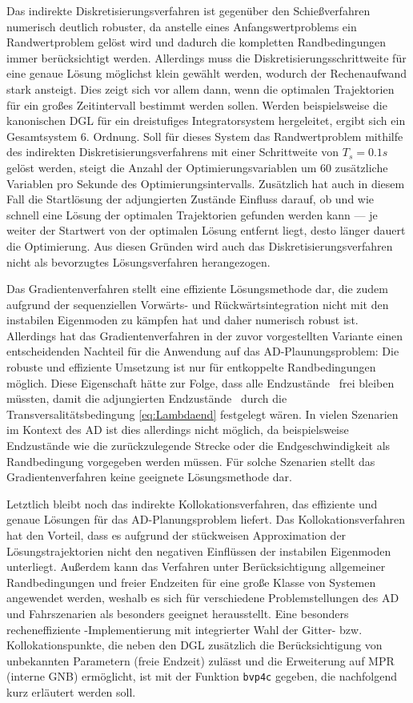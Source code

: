 Das indirekte Diskretisierungsverfahren ist gegenüber den Schießverfahren numerisch deutlich robuster, da anstelle eines Anfangswertproblems ein Randwertproblem gelöst wird und dadurch die kompletten Randbedingungen immer berücksichtigt werden. Allerdings muss die Diskretisierungsschrittweite für eine genaue Lösung möglichst klein gewählt werden, wodurch der Rechenaufwand stark ansteigt. Dies zeigt sich vor allem dann, wenn die optimalen Trajektorien für ein großes Zeitintervall bestimmt werden sollen. Werden beispielsweise die kanonischen \gls{DGL} für ein dreistufiges Integratorsystem hergeleitet, ergibt sich ein Gesamtsystem 6. Ordnung. Soll für dieses System das Randwertproblem mithilfe des indirekten Diskretisierungsverfahrens mit einer Schrittweite von $T_s = 0.1\unit{s}$ gelöst werden, steigt die Anzahl der Optimierungsvariablen um 60 zusätzliche Variablen pro Sekunde des Optimierungsintervalls. Zusätzlich hat auch in diesem Fall die Startlösung der adjungierten Zustände Einfluss darauf, ob und wie schnell eine Lösung der optimalen Trajektorien gefunden werden kann --- je weiter der Startwert von der optimalen Lösung entfernt liegt, desto länger dauert die Optimierung. Aus diesen Gründen wird auch das Diskretisierungsverfahren nicht als bevorzugtes Lösungsverfahren herangezogen. 

Das Gradientenverfahren stellt eine effiziente Lösungsmethode dar, die zudem aufgrund der sequenziellen Vorwärts- und Rückwärtsintegration nicht mit den instabilen Eigenmoden zu kämpfen hat und daher numerisch robust ist. Allerdings hat das Gradientenverfahren in der zuvor vorgestellten Variante einen entscheidenden Nachteil für die Anwendung auf das \gls{AD}-Plaunungsproblem: Die robuste und effiziente Umsetzung ist nur für entkoppelte Randbedingungen möglich. Diese Eigenschaft hätte zur Folge, dass alle Endzustände \xoftf~frei bleiben müssten, damit die adjungierten Endzustände \lambdaoftf~durch die Transversalitätsbedingung \eqref{eq:Lambdaend} festgelegt wären. In vielen Szenarien im Kontext des \gls{AD} ist dies allerdings nicht möglich, da beispielsweise Endzustände wie die zurückzulegende Strecke oder die Endgeschwindigkeit als Randbedingung vorgegeben werden müssen. Für solche Szenarien stellt das Gradientenverfahren keine geeignete Lösungsmethode dar. 

Letztlich bleibt noch das indirekte Kollokationsverfahren, das effiziente und genaue Lösungen für das \gls{AD}-Planungsproblem liefert. Das Kollokationsverfahren hat den Vorteil, dass es aufgrund der stückweisen Approximation der Lösungstrajektorien nicht den negativen Einflüssen der instabilen Eigenmoden unterliegt. Außerdem kann das Verfahren unter Berücksichtigung allgemeiner Randbedingungen und freier Endzeiten für eine große Klasse von Systemen angewendet werden, weshalb es sich für verschiedene Problemstellungen des \gls{AD} und Fahrszenarien als besonders geeignet herausstellt. Eine besonders recheneffiziente \Matlab-Implementierung mit integrierter Wahl der Gitter- bzw. Kollokationspunkte, die neben den \gls{DGL} zusätzlich die Berücksichtigung von unbekannten Parametern (freie Endzeit) zulässt und die Erweiterung auf \gls{MPR} (interne \gls{GNB}) ermöglicht, ist mit der Funktion \texttt{bvp4c} gegeben, die nachfolgend kurz erläutert werden soll.
